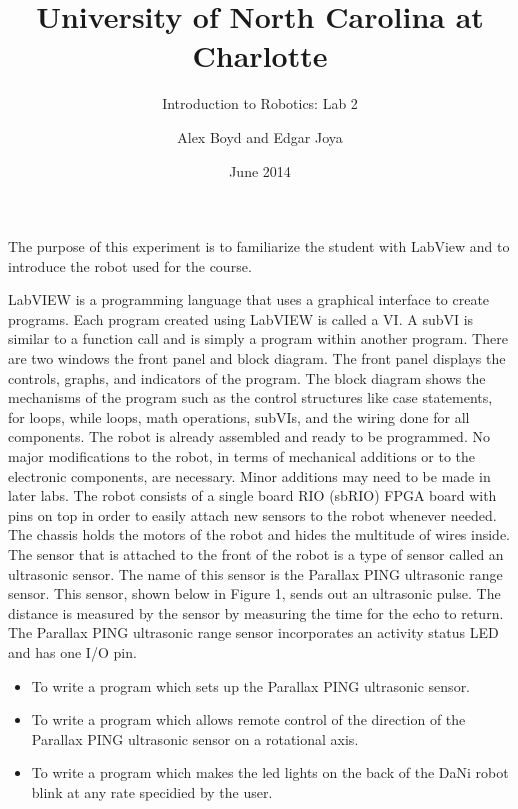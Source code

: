 \documentclass{scrartcl}
\title{University of North Carolina at Charlotte}
\subtitle{Introduction to Robotics: Lab 2}
\author{Alex Boyd and Edgar Joya}
\date{June 2014}
\begin{document}
\maketitle
\tableofcontents

The purpose of this experiment is to familiarize the student with LabView and to introduce the robot used for the course.

LabVIEW is a programming language that uses a graphical interface to create programs. Each 
program created using LabVIEW is called a VI. A subVI is similar to a function call and is 
simply a program within another program. There are two windows the front panel and block 
diagram. The front panel displays the controls, graphs, and indicators of the program. The block 
diagram shows the mechanisms of the program such as the control structures like case 
statements, for loops, while loops, math operations, subVIs, and the wiring done for all 
components. 
The robot is already assembled and ready to be programmed. No major modifications to the 
robot, in terms of mechanical additions or to the electronic components, are necessary. Minor 
additions may need to be made in later labs. The robot consists of a single board RIO (sbRIO) 
FPGA board with pins on top in order to easily attach new sensors to the robot whenever needed. 
The chassis holds the motors of the robot and hides the multitude of wires inside. 
The sensor that is attached to the front of the robot is a type of sensor called an ultrasonic sensor. 
The name of this sensor is the Parallax PING ultrasonic range sensor. This sensor, shown below 
in Figure 1, sends out an ultrasonic pulse. The distance is measured by the sensor by measuring 
the time for the echo to return. The Parallax PING ultrasonic range sensor incorporates an 
activity status LED and has one I/O pin. 

\begin{itemize}
\item To write a program which sets up the Parallax PING ultrasonic sensor.

\item To write a program which allows remote control of the direction of the Parallax PING ultrasonic sensor on a  rotational axis. 

\item To write a program which makes the led lights on the back of the DaNi robot blink at any rate specidied by the user.
\end{itemize}
\end{document}
